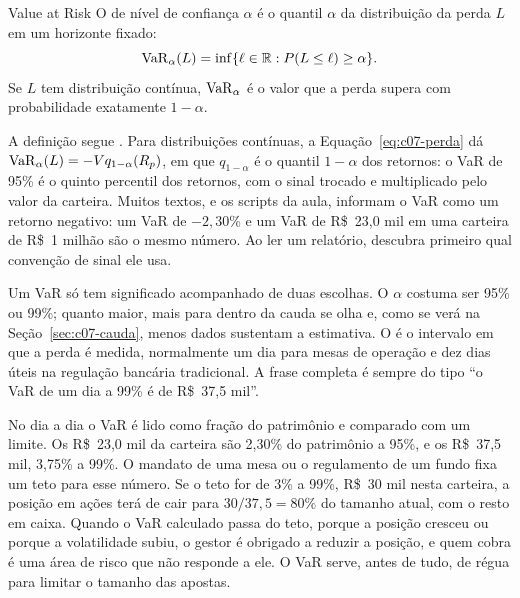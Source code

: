 
\begin{definicao}{Value at Risk}
O  de nível de confiança $\alpha$ é o quantil $\alpha$ da distribuição da perda $L$ em um horizonte fixado:
\begin{equation}
  \operatorname{VaR}_\alpha(L) = \inf\{\ell \in \mathbb{R} : P(L \le \ell) \ge \alpha\} .
  \label{eq:c07-var}
\end{equation}
Se $L$ tem distribuição contínua, $\operatorname{VaR}_\alpha$ é o valor que a perda supera com probabilidade exatamente $1-\alpha$.
\end{definicao}

A definição segue \citet{mcneil2015}. Para distribuições contínuas, a Equação~\eqref{eq:c07-perda} dá $\operatorname{VaR}_\alpha(L) = -V q_{1-\alpha}(R_p)$, em que $q_{1-\alpha}$ é o quantil $1-\alpha$ dos retornos: o VaR de 95\% é o quinto percentil dos retornos, com o sinal trocado e multiplicado pelo valor da carteira. Muitos textos, e os scripts da aula, informam o VaR como um retorno negativo: um VaR de $-2,30\%$ e um VaR de R\$~23,0 mil em uma carteira de R\$~1 milhão são o mesmo número. Ao ler um relatório, descubra primeiro qual convenção de sinal ele usa.

Um VaR só tem significado acompanhado de duas escolhas. O  $\alpha$ costuma ser 95\% ou 99\%; quanto maior, mais para dentro da cauda se olha e, como se verá na Seção~\ref{sec:c07-cauda}, menos dados sustentam a estimativa. O  é o intervalo em que a perda é medida, normalmente um dia para mesas de operação e dez dias úteis na regulação bancária tradicional. A frase completa é sempre do tipo ``o VaR de um dia a 99\% é de R\$~37,5 mil''.

No dia a dia o VaR é lido como fração do patrimônio e comparado com um limite. Os R\$~23,0 mil da carteira são 2,30\% do patrimônio a 95\%, e os R\$~37,5 mil, 3,75\% a 99\%. O mandato de uma mesa ou o regulamento de um fundo fixa um teto para esse número. Se o teto for de 3\% a 99\%, R\$~30 mil nesta carteira, a posição em ações terá de cair para $30/37,5 = 80\%$ do tamanho atual, com o resto em caixa. Quando o VaR calculado passa do teto, porque a posição cresceu ou porque a volatilidade subiu, o gestor é obrigado a reduzir a posição, e quem cobra é uma área de risco que não responde a ele. O VaR serve, antes de tudo, de régua para limitar o tamanho das apostas.

